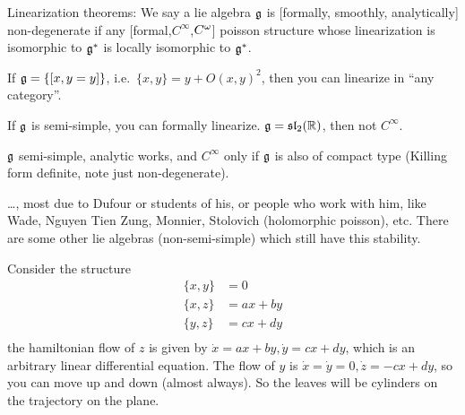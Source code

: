  Linearization theorems: We say a lie algebra $\mathfrak{g}$ is [formally, smoothly,
 analytically] non-degenerate if any [formal,$C^\infty$,$C^{\omega}$] poisson structure
 whose linearization is isomorphic to $\mathfrak{g}^*$ is locally isomorphic to $\mathfrak{g}^*$.
 \begin{theorem}[Arnol'd]
   If $\mathfrak{g}=\{[x,y=y]\}$, i.e.~$\{x,y\}=y+O(x,y)^2$, then you can linearize in ``any
   category''.
 \end{theorem}
 \begin{theorem}[Weinstein]
 If $\mathfrak{g}$ is semi-simple, you can formally linearize. $\mathfrak{g}=\mathfrak{sl}_2(\mathbb{R})$, then
 not $C^\infty$.
 \end{theorem}
 \begin{theorem}[Conn]
   $\mathfrak{g}$ semi-simple, analytic works, and $C^\infty$ only if $\mathfrak{g}$ is also of compact
   type (Killing form definite, note just non-degenerate).
 \end{theorem}
 \dots, most due to Dufour or students of his, or people who work with him, like Wade,
 Nguyen Tien Zung, Monnier, Stolovich (holomorphic poisson), etc.  There are some
 other lie algebras (non-semi-simple) which still have this stability.

 Consider the structure
 \begin{align*}
   \{x,y\} &=0\\
   \{x,z\} &=ax+by\\
   \{y,z\} &=cx+dy\\
 \end{align*}
 the hamiltonian flow of $z$ is given by $\dot{x}=ax+by, \dot{y}=cx+dy$, which is an
 arbitrary linear differential equation. The flow of $y$ is $\dot x=\dot y=0,\dot
 z=-cx+dy$, so you can move up and down (almost always).  So the leaves will be
 cylinders on the trajectory on the plane.

